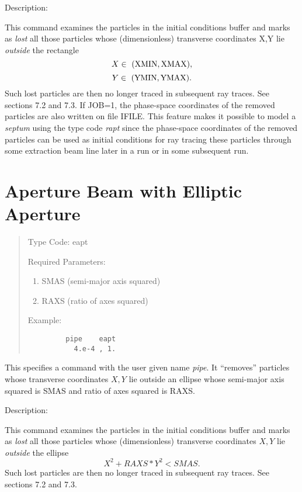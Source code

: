 \vspace{5mm}
     Description:
\vspace{2mm}

This command examines the particles in the initial conditions buffer and marks
as {\em lost} all those particles whose (dimensionless) transverse coordinates
X,Y lie {\em outside} the rectangle
\[
X \in \ {\rm (XMIN, XMAX)},
\]
\[
Y \in \ {\rm (YMIN, YMAX)}.
\]
Such lost particles are then no longer traced in subsequent ray traces.  See
sections 7.2 and 7.3.  If JOB=1, the phase-space coordinates of the removed particles are also written on file IFILE.  This feature makes it possible to model a {\em septum} using the type code {\em rapt} since the phase-space coordinates of the removed particles can be used as initial conditions for ray tracing these particles through some extraction beam line later in a \Mary run or in some subsequent \Mary run.

\newpage
\section{Aperture Beam with Elliptic Aperture}
\begin{quotation}
\noindent Type Code:  eapt
\vspace{5mm}

\noindent Required Parameters:
\begin{enumerate}
      \item  SMAS (semi-major axis squared)

      \item  RAXS (ratio of axes squared)
\end{enumerate}

\vspace{5mm}
\noindent Example:
\begin{verbatim}
         pipe    eapt
           4.e-4 , 1.
\end{verbatim}
\end{quotation}
This specifies a command with the user given name {\em pipe}.  It ``removes'' particles whose transverse coordinates $X,Y$ lie outside an ellipse whose semi-major axis squared is SMAS and ratio of axes squared is RAXS.

\vspace{5mm}
     Description:
\vspace{2mm}

This command examines the particles in the initial conditions buffer and marks as {\em lost} all those particles whose (dimensionless) transverse coordinates $X,Y$ lie {\em outside} the ellipse
\[
X^2 + RAXS * Y^2 < SMAS.
\]
Such lost particles are then no longer traced in subsequent ray traces.  See sections 7.2 and 7.3.

